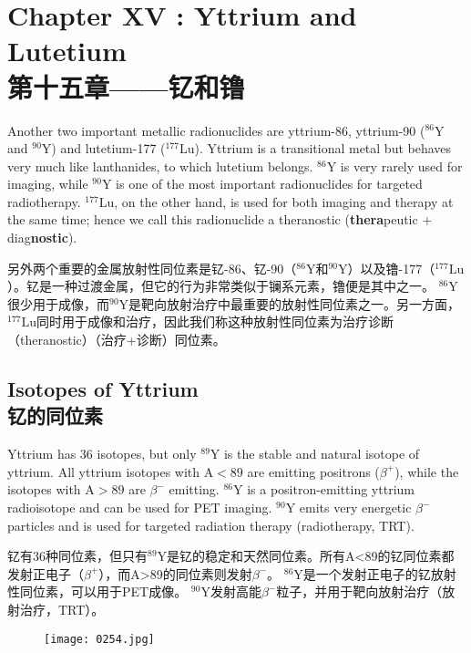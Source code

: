\documentclass[dvipsnames, svgnames,a4paper,11pt]{article}
\begin{document}
\newpage


\section{Chapter XV :   Yttrium and Lutetium \\第十五章——钇和镥}

Another two important metallic radionuclides are yttrium-86, yttrium-90 (\(\mathrm{^{86}Y}\) and \(\mathrm{^{90}Y}\)) and lutetium-177 (\(\mathrm{^{177}Lu}\)). Yttrium is a transitional metal but behaves very much like lanthanides, to which lutetium belongs. \(\mathrm{^{86}Y}\) is very rarely used for imaging, while \(\mathrm{^{90}Y}\) is one of the most important radionuclides for targeted radiotherapy. \(\mathrm{^{177}Lu}\), on the other hand, is used for both imaging and therapy at the same time; hence we call this radionuclide a theranostic (\textbf{thera}peutic + diag\textbf{nostic}).

另外两个重要的金属放射性同位素是钇-86、钇-90（\(\mathrm{^{86}Y}\)和\(\mathrm{^{90}Y}\)）以及镥-177（\(\mathrm{^{177}Lu}\)）。钇是一种过渡金属，但它的行为非常类似于镧系元素，镥便是其中之一。 \(\mathrm{^{86}Y}\)很少用于成像，而\(\mathrm{^{90}Y}\)是靶向放射治疗中最重要的放射性同位素之一。另一方面，\(\mathrm{^{177}Lu}\)同时用于成像和治疗，因此我们称这种放射性同位素为治疗诊断（theranostic）（治疗+诊断）同位素。

\subsection{Isotopes of Yttrium\\ 钇的同位素}  

Yttrium has 36 isotopes, but only \(\mathrm{^{89}Y}\) is the stable and natural isotope of yttrium. All yttrium isotopes with \(\mathrm{A} < 89\) are emitting positrons (\(\beta^+\)), while the isotopes with \(\mathrm{A} > 89\) are \(\beta^-\) emitting. \(\mathrm{^{86}Y}\) is a positron-emitting yttrium radioisotope and can be used for PET imaging. \(\mathrm{^{90}Y}\) emits very energetic \(\beta^-\) particles and is used for targeted radiation therapy (radiotherapy, TRT).

钇有36种同位素，但只有\(\mathrm{^{89}Y}\)是钇的稳定和天然同位素。所有A<89的钇同位素都发射正电子（\(\beta^+\)），而A>89的同位素则发射\(\beta^-\)。 \(\mathrm{^{86}Y}\)是一个发射正电子的钇放射性同位素，可以用于PET成像。 \(\mathrm{^{90}Y}\)发射高能\(\beta^-\)粒子，并用于靶向放射治疗（放射治疗，TRT）。

\begin{figure}[h]
	\centering
    \texttt{[image: 0254.jpg]}  
     \label{fig341}
\end{figure}
\end{document}
